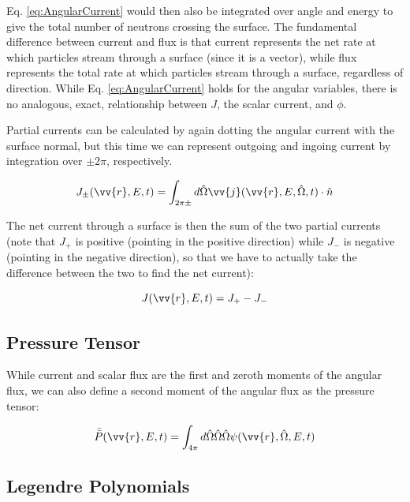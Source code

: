 \documentclass[10pt]{article}
\begin{document}
\begin{flushleft}
Eq. \ref{eq:AngularCurrent} would then also be integrated over angle and energy to give the total number of neutrons crossing the surface. The fundamental difference between current and flux is that current represents the net rate at which particles stream through a surface (since it is a vector), while flux represents the total rate at which particles stream through a surface, regardless of direction. While Eq. \ref{eq:AngularCurrent} holds for the angular variables, there is no analogous, exact, relationship between \(J\), the scalar current, and \(\phi\). 

Partial currents can be calculated by again dotting the angular current with the surface normal, but this time we can represent outgoing and ingoing current by integration over \(\pm 2\pi\), respectively.

\begin{equation}
\label{eq:PartialCurrent}
J_\pm (\vv{r}, E, t) = \int_{2\pi\pm}^{} d\hat{\Omega} \vv{j}(\vv{r}, E, \hat{\Omega}, t)\cdot\hat{n}
\end{equation}

The net current through a surface is then the sum of the two partial currents (note that \(J_+\) is positive (pointing in the positive direction) while \(J_-\) is negative (pointing in the negative direction), so that we have to actually take the difference between the two to find the net current):

\begin{equation}
\label{eq:TotalCurrent}
J (\vv{r}, E, t) = J_+ - J_-
\end{equation}

\subsection{Pressure Tensor}

While current and scalar flux are the first and zeroth moments of the angular flux, we can also define a second moment of the angular flux as the pressure tensor:

\begin{equation}
\label{eq:PressureTensor}
\bar{\bar{P}}(\vv{r},E,t)=\int_{4\pi}^{}d\hat{\Omega}\hat{\Omega}\hat{\Omega}\psi(\vv{r},\hat{\Omega},E,t)
\end{equation}

\subsection{Legendre Polynomials}


\end{flushleft}
\end{document}
